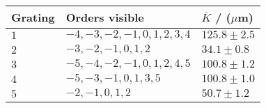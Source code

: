 	\begin{tabular}{|p{3.82cm}|p{6.18cm}|p{3.82cm}|}
		\hline
		\rowcolor{tabcolor}
		Grating & Orders visible & $\overline{K}$ / ($\mu$m)  \\ \hline
		$1$  & $-4, -3, -2, -1, 0, 1, 2, 3, 4$ & $ 125.8 \pm 2.5 $ \\
		$2$  & $-3, -2, -1, 0, 1, 2$ & $ 34.1 \pm 0.8 $ \\
		$3$  & $-5, -4, -2, -1, 0, 1, 2, 4, 5$ & $ 100.8 \pm 1.2 $ \\
		$4$  & $-5, -3, -1, 0, 1, 3, 5$ & $ 100.8 \pm 1.0 $ \\
		$5$  & $-2, -1, 0, 1, 2$ & $ 50.7 \pm 1.2 $ \\
		\hline
	\end{tabular}
